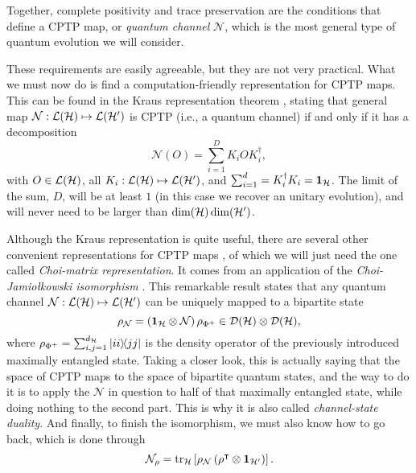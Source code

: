 		Together, complete positivity and trace preservation are the conditions that define a CPTP map, or \emph{quantum channel} $\mathcal{N}$, which is the most general type of quantum evolution we will consider.
		
		These requirements are easily agreeable, but they are not very practical. What we must now do is find a computation-friendly representation for CPTP maps. This can be found in the Kraus representation theorem \cite{wilde_2013_book}, stating that general map $\mathcal{N} : \mathcal{L}(\mathcal{H}) \mapsto \mathcal{L}(\mathcal{H}^\prime)$ is CPTP (i.e., a quantum channel) if and only if it has a decomposition
		$$
			\mathcal{N}(O) = \sum_{i=1}^D K_i O K_i^\dagger ,
		$$
		with $O \in \mathcal{L}(\mathcal{H})$, all $K_i : \mathcal{L}(\mathcal{H}) \mapsto \mathcal{L}(\mathcal{H}^\prime)$, and $\sum_{i=1}^d = K_i^\dagger K_i = \mathbf{1}_{\mathcal{H}}$. The limit of the sum, $D$, will be at least $1$ (in this case we recover an unitary evolution), and will never need to be larger than $\text{dim}(\mathcal{H}) \,\text{dim}(\mathcal{H}^\prime)$.
		
		Although the Kraus representation is quite useful, there are several other convenient representations for CPTP maps \cite{wood_2015_tensor}, of which we will just need the one called \emph{Choi-matrix representation}. It comes from an application of the \emph{Choi-Jamiołkowski isomorphism} \cite{jamiolkowski,jiang_2013_channelstate}. This remarkable result states that any quantum channel $\mathcal{N} : \mathcal{L}(\mathcal{H}) \mapsto \mathcal{L}(\mathcal{H}^\prime)$ can be uniquely mapped to a bipartite state
		$$
			\rho_{\mathcal{N}} = \left(\mathbf{1}_{\mathcal{H}} \otimes \mathcal{N} \right) \rho_{\Phi^+} \in \mathcal{D}(\mathcal{H}) \otimes \mathcal{D}(\mathcal{H}) ,
		$$
		where $\rho_{\Phi^+} = \sum_{i,j=1}^{d_{\mathcal{H}}} \ketbra{ii}{jj}$ is the density operator of the previously introduced maximally entangled state. Taking a closer look, this is actually saying that the space of CPTP maps to the space of bipartite quantum states, and the way to do it is to apply the $\mathcal{N}$ in question to half of that maximally entangled state, while doing nothing to the second part. This is why it is also called \emph{channel-state duality}. And finally, to finish the isomorphism, we must also know how to go back, which is done through
		$$
			\mathcal{N}_\rho = \text{tr}_{\mathcal{H}}\left[ \rho_{\mathcal{N}} \left( \rho^\intercal \otimes \mathbf{1}_{\mathcal{H}^\prime} \right) \right] .
		$$
		
